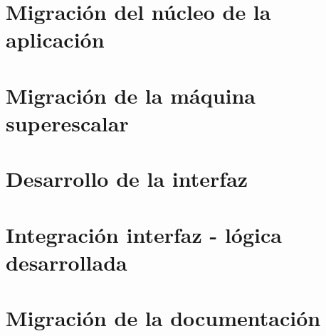 

\section{Migración del núcleo de la aplicación}
\label{5:sec1} 


\section{Migración de la máquina superescalar}
\label{5:sec2} 


\section{Desarrollo de la interfaz}
\label{5:sec3} 


\section{Integración interfaz - lógica desarrollada}
\label{5:sec4} 


\section{Migración de la documentación}
\label{5:sec5} 

